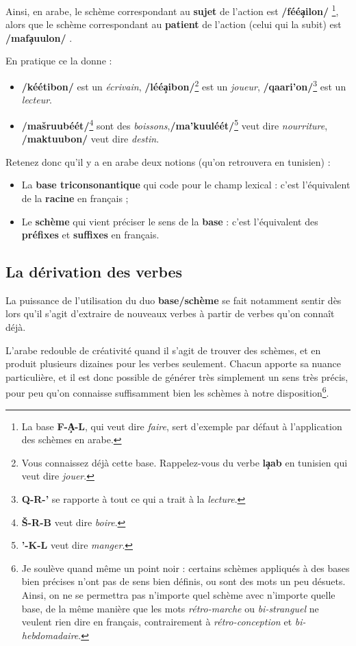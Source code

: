 Ainsi, en arabe, le schème correspondant au \textbf{sujet} de l'action est \textbf{/féé\c{a}ilon/} \footnote{La base \textbf{F-\c{A}-L}, qui veut dire \textit{faire}, sert d'exemple par défaut à l'application des schèmes en arabe.}, alors que le schème correspondant au \textbf{patient} de l'action (celui qui la subit) est \textbf{/maf\c{a}uulon/} . 

En pratique ce la donne : 

\begin{itemize}
    \item \textbf{/kéétibon/} est un \textit{écrivain}, \textbf{/léé\c{a}ibon/}\footnote{Vous connaissez déjà cette base. Rappelez-vous du verbe \textbf{l\c{a}ab} en tunisien qui veut dire \textit{jouer}.} est un \textit{joueur}, \textbf{/qaari'on/}\footnote{\textbf{Q-R-'} se rapporte à tout ce qui a trait à la \textit{lecture}.} est un \textit{lecteur}.
    \item \textbf{/ma\v{s}ruubéét/}\footnote{\textbf{\v{S}-R-B} veut dire \textit{boire}.} sont des \textit{boissons},\textbf{/ma'kuuléét/}\footnote{\textbf{'-K-L} veut dire \textit{manger}.} veut dire \textit{nourriture}, \textbf{/maktuubon/} veut dire \textit{destin}.
\end{itemize}

Retenez donc qu'il y a en arabe deux notions (qu'on retrouvera en tunisien) : 

\begin{itemize}
    \item La \textbf{base triconsonantique} qui code pour le champ lexical : c'est  l'équivalent de la \textbf{racine} en français ;
    \item Le \textbf{schème} qui vient préciser le sens de la \textbf{base} : c'est l'équivalent des \textbf{préfixes} et \textbf{suffixes} en français.
\end{itemize}

\subsection{La dérivation des verbes}
La puissance de l'utilisation du duo \textbf{base/schème} se fait notamment sentir dès lors qu'il s'agit d'extraire de nouveaux verbes à partir de verbes qu'on connaît déjà.

L'arabe redouble de créativité quand il s'agit de trouver des schèmes, et en produit plusieurs dizaines pour les verbes seulement. Chacun apporte sa nuance particulière, et il est donc possible de générer très simplement un sens très précis, pour peu qu'on connaisse suffisamment bien les schèmes à notre disposition\footnote{Je soulève quand même un point noir : certains schèmes appliqués à des bases bien précises n'ont pas de sens bien définis, ou sont des mots un peu désuets. Ainsi, on ne se permettra pas n'importe quel schème avec n'importe quelle base, de la même manière que les mots \textit{rétro-marche} ou \textit{bi-stranguel} ne veulent rien dire en français, contrairement à \textit{rétro-conception} et \textit{bi-hebdomadaire}.}. 

